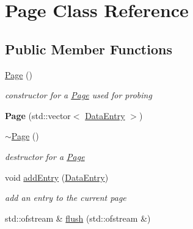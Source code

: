 \hypertarget{class_page}{}\section{Page Class Reference}
\label{class_page}
\subsection*{Public Member Functions}
\begin{DoxyCompactItemize}
\item 
\hypertarget{class_page_a9a7cc22d5459498ce638c54ae966c79b}{}\hyperlink{class_page_a9a7cc22d5459498ce638c54ae966c79b}{Page} ()\label{class_page_a9a7cc22d5459498ce638c54ae966c79b}

\begin{DoxyCompactList}\small\item\em constructor for a \hyperlink{class_page}{Page} used for probing \end{DoxyCompactList}\item 
\hypertarget{class_page_a7f324ffee128c9356321edfdcce791d2}{}{\bfseries Page} (std\+::vector$<$ \hyperlink{class_data_entry}{Data\+Entry} $>$)\label{class_page_a7f324ffee128c9356321edfdcce791d2}

\item 
\hypertarget{class_page_a2341fff1cc032ab6528874175e7dd841}{}\hyperlink{class_page_a2341fff1cc032ab6528874175e7dd841}{$\sim$\+Page} ()\label{class_page_a2341fff1cc032ab6528874175e7dd841}

\begin{DoxyCompactList}\small\item\em destructor for a \hyperlink{class_page}{Page} \end{DoxyCompactList}\item 
\hypertarget{class_page_ace77ab8193c19fc94e322d495b316195}{}void \hyperlink{class_page_ace77ab8193c19fc94e322d495b316195}{add\+Entry} (\hyperlink{class_data_entry}{Data\+Entry})\label{class_page_ace77ab8193c19fc94e322d495b316195}

\begin{DoxyCompactList}\small\item\em add an entry to the current page \end{DoxyCompactList}\item 
\hypertarget{class_page_a6dbbd6372d07a62279fae471be5e54a2}{}std\+::ofstream \& \hyperlink{class_page_a6dbbd6372d07a62279fae471be5e54a2}{flush} (std\+::ofstream \&)\label{class_page_a6dbbd6372d07a62279fae471be5e54a2}


\end{DoxyCompactItemize}
